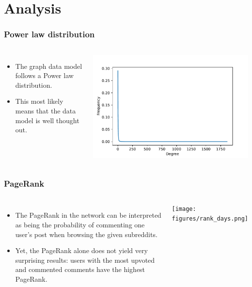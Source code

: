 \documentclass[aspectratio=169]{beamer}
\begin{document}
\section{Analysis}
\begin{frame}[t]
    \frametitle{Power law distribution}
    \vspace{1.0cm}
    \begin{columns}
        \begin{itemize}
            \item The graph data model follows a Power law distribution.
            \item This most likely means that the data model is well thought out.
        \end{itemize}
        \includegraphics[width=\textwidth]{figures/deg_dist.pdf}
    \end{columns}
\end{frame}
\begin{frame}[t]
    \frametitle{PageRank}
    \begin{columns}
        \begin{itemize}
            \item The PageRank in the network can be interpreted as being the probability of commenting one user's post when browsing the given subreddits.
            \item Yet, the PageRank alone does not yield very surprising results: users with the most upvoted and commented comments have the highest PageRank.
        \end{itemize}
        \texttt{[image: figures/rank\_days.png]}
    \end{columns}
\end{frame}
\end{document}
